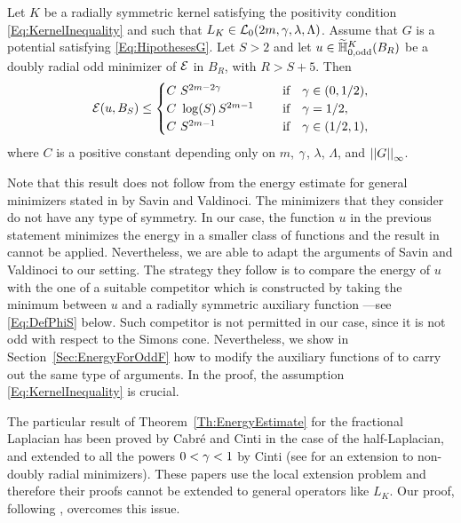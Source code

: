 \begin{theorem}
	\label{Th:EnergyEstimate} 
	Let $K$ be a radially symmetric kernel satisfying the positivity condition \eqref{Eq:KernelInequality} and such that $L_K\in \mathcal{L}_0(2m, \gamma, \lambda, \Lambda)$. Assume that $G$ is a potential satisfying \eqref{Eq:HipothesesG}. Let $S>2$ and let $u\in \widetilde{\mathbb{H}}^K_{0, \mathrm{odd}}(B_R)$ be a doubly radial odd minimizer of $\mathcal{E}$ in $B_R$, with $R>S+5$. Then
	$$ \mathcal{E} (u,B_S) \leq \begin{cases}
	C \ S^{2m-2\gamma}\ \ \ \ &\textrm{if } \ \ \gamma\in(0,1/2),\\
	C\ \log(S)\,S^{2m-1}\ \ \ \ &\textrm{if } \ \ \gamma=1/2,\\
	C \ S^{2m-1}\ \ \ \ &\textrm{if } \ \ \gamma\in(1/2,1),\\
	\end{cases} $$
	where $C$ is a positive constant depending only on $m$, $\gamma$, $\lambda$, $\Lambda$, and $\left | \left |{G} \right | \right |_\infty$.
\end{theorem}

Note that this result does not follow from the energy estimate for general minimizers 
stated in \cite{SavinValdinoci-EnergyEstimate} by Savin and Valdinoci. The minimizers that they consider do not have any type of symmetry. In our case, the function $u$ in the previous statement minimizes the energy in a smaller class of functions and the result in \cite{SavinValdinoci-EnergyEstimate} cannot be applied. Nevertheless, we are able to adapt the arguments of Savin and Valdinoci to our setting.  The strategy they follow is to compare the energy of $u$ with the one of a suitable competitor which is constructed by taking the minimum between $u$ and a radially symmetric auxiliary function ---see \eqref{Eq:DefPhiS} below. Such competitor is not permitted in our case, since it is not odd with respect to the Simons cone. Nevertheless, we show in Section~\ref{Sec:EnergyForOddF} how to modify the auxiliary functions of \cite{SavinValdinoci-EnergyEstimate} to carry out the same type of arguments. In the proof, the assumption \eqref{Eq:KernelInequality} is crucial.

The particular result of Theorem~\ref{Th:EnergyEstimate} for the fractional Laplacian has been proved by Cabré and Cinti \cite{CabreCinti-EnergyHalfL} in the case of the half-Laplacian, and extended to all the powers $0<\gamma<1$ by Cinti \cite{Cinti-Saddle2} (see \cite{CabreCinti-SharpEnergy} for an extension to non-doubly radial minimizers). These papers use the local extension problem and therefore their proofs cannot be extended to general operators like $L_K$. Our proof, following \cite{SavinValdinoci-EnergyEstimate}, overcomes this issue.


